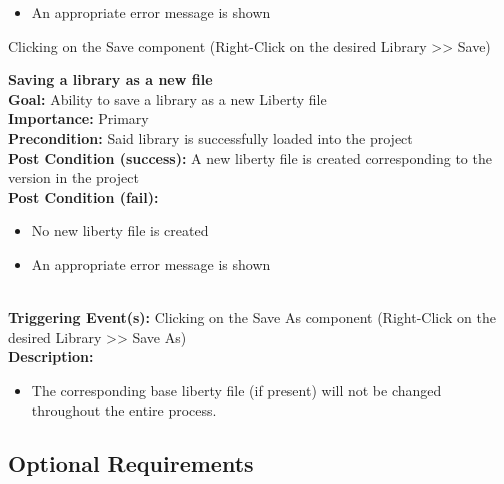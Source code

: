 \documentclass[10pt,a4paper]{report}
\newcommand{\precondition}[1]{
    \textbf{Precondition: } #1 \leavevmode \\
}
\newcommand{\FRDescription}[8]{
    \textbf{#1} \leavevmode \\
    \textbf{Goal: } #2 \leavevmode \\
    \textbf{Importance: } #3 \leavevmode \\
    \precondition{#4}
    \textbf{Post Condition (success): } #5 \leavevmode \\
    \textbf{Post Condition (fail): } #6 \leavevmode \\
    \textbf{Triggering Event(s): } #7 \leavevmode \\
    \textbf{Description: } \leavevmode \\ 
    #8}
\begin{document}
\begin{FR}
{\begin{itemize}
        \item An appropriate error message is shown
    \end{itemize}}
    {Clicking on the Save component (Right-Click on the desired Library  >> Save)}
    \item \FRDescription{Saving a library as a new file}
    {Ability to save a library as a new Liberty file}
    {Primary}
    {Said library is successfully loaded into the project}
    {A new liberty file is created corresponding to the version in the project}
    {\begin{itemize}
        \item No new liberty file is created
        \item An appropriate error message is shown
    \end{itemize}}
    {Clicking on the Save As component (Right-Click on the desired Library  >> Save As)}
    {\begin{itemize}
        \item The corresponding base liberty file (if present) will not be changed throughout the entire process.
    \end{itemize}}
\end{FR}

\subsection{Optional Requirements}
\end{document}
